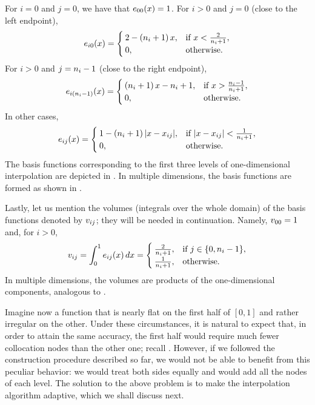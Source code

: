  For $i =
0$ and $j = 0$, we have that $e_{00}(x) = 1$. For $i > 0$ and $j = 0$ (close
to the left endpoint),
\[
  e_{i0}(x) = \begin{cases}
    2 - \left( n_i + 1 \right) x, & \text{if } x < \frac{2}{n_i + 1}, \\
    0, & \text{otherwise}.
  \end{cases}
\]
For $i > 0$ and $j = n_i - 1$ (close to the right endpoint),
\[
  e_{i(n_i - 1)}(x) = \begin{cases}
    \left( n_i + 1 \right) x - n_i + 1, & \text{if } x > \frac{n_i - 1}{n_i + 1}, \\
    0, & \text{otherwise}.
  \end{cases}
\]
In other cases,
\[
  e_{ij}(x) = \begin{cases}
    1 - \left( n_i + 1 \right)|x - x_{ij}|, & \text{if } |x - x_{ij}| < \frac{1}{n_i + 1}, \\
    0, & \text{otherwise}.
  \end{cases}
\]
The basis functions corresponding to the first three levels of one-dimensional
interpolation are depicted in . In multiple dimensions, the basis
functions are formed as shown in .

Lastly, let us mention the volumes (integrals over the whole domain) of the
basis functions denoted by $v_{ij}$; they will be needed in continuation.
Namely, $v_{00} = 1$ and, for $i > 0$,
\begin{equation} \elab{volume}
  \w_{ij} = \int_0^1 \e_{ij}(\x) \, \d\x = \begin{cases}
    \frac{2}{\n_i + 1}, & \text{if } j \in \{ 0, \n_i - 1 \}, \\
    \frac{1}{\n_i + 1}, & \text{otherwise}.
  \end{cases}
\end{equation}
In multiple dimensions, the volumes are products of the one-dimensional
components, analogous to .

Imagine now a function that is nearly flat on the first half of $[0, 1]$ and
rather irregular on the other. Under these circumstances, it is natural to
expect that, in order to attain the same accuracy, the first half would require
much fewer collocation nodes than the other one; recall .
However, if we followed the construction procedure described so far, we would
not be able to benefit from this peculiar behavior: we would treat both sides
equally and would add all the nodes of each level. The solution to the above
problem is to make the interpolation algorithm adaptive, which we shall discuss
next.
